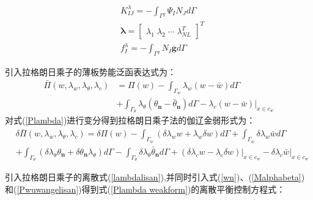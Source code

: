 \begin{subequations}
\begin{align}
    &K_{IJ}^{\lambda}=-\int_{\Gamma^g}\Psi_IN_Jd\Gamma\\
    &\pmb{\lambda}= \left[\begin{matrix}\lambda_1\;\lambda_2\;\dotsb\;\lambda_{N\!L}^T\end{matrix}\right]^T\\
    &f_I^{\lambda}=-\int_{\Gamma^g}N_I\pmb{g}d\Gamma
\end{align}
\end{subequations}\par
引入拉格朗日乘子的薄板势能泛函表达式为：
\begin{equation}\label{Plambda}
\begin{split}
    \bar{\Pi}(w,\lambda_w,\lambda_{\theta},\lambda_c)&=\Pi(w)-\int_{\Gamma_w}\lambda_w(w-\bar{w})d\Gamma\\
    &+\int_{\Gamma_{\theta}}\lambda_{\theta}(\theta_{\pmb n}-\bar{\theta}_{\pmb n})d\Gamma-\lambda_c(w-\bar{w})\vert_{x\in c_w}
\end{split}
\end{equation}
对式(\ref{Plambda})进行变分得到拉格朗日乘子法的伽辽金弱形式为：
\begin{equation}\label{Plambda weakform}
\begin{split}
    &\delta\bar{\Pi}(w,\lambda_w,\lambda_{\theta},\lambda_c)=\delta\Pi(w)-\int_{\Gamma_w}(\delta\lambda_w w+\lambda_w\delta w)d\Gamma+\int_{\Gamma_w}\delta\lambda_w\bar{w}d\Gamma\\
&+\int_{\Gamma_{\theta}}(\delta\lambda_{\theta}\theta_{\pmb n}+\delta\theta_{\pmb n}\lambda_{\theta})d\Gamma-\int_{\Gamma_{\theta}}\delta\lambda_{\theta}\bar{\theta}_{\pmb n}d\Gamma
+(\delta\lambda_c w-\lambda_c\delta w)\vert_{x\in c_w}-\delta\lambda_c\bar{w}\vert_{x\in c_w}
\end{split}
\end{equation}\par
引入拉格朗日乘子的离散式(\ref{lambdalisan}),并同时引入式(\ref{wn})、(\ref{Malphabeta})和(\ref{Pwuwangelisan})得到式(\ref{Plambda weakform})的离散平衡控制方程式：
